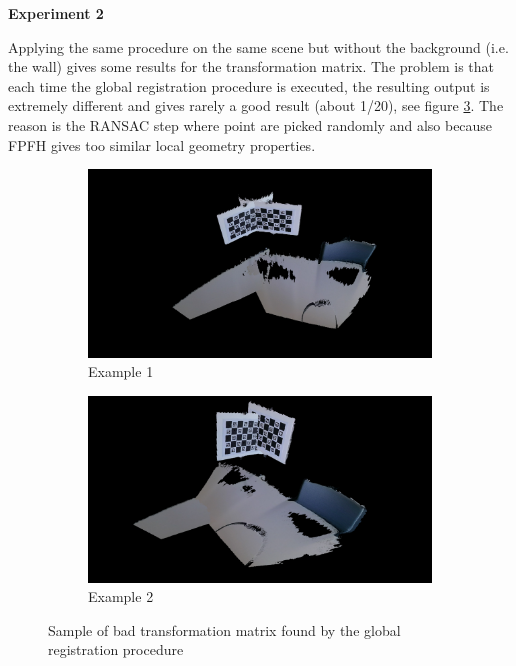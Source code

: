 \textbf{Experiment 2}

Applying the same procedure on the same scene but without the background (i.e. the wall) gives some results for the transformation matrix. The problem is that each time the global registration procedure is executed, the resulting output is extremely different and gives rarely a good result (about 1/20), see figure \ref{figure:ransac}. The reason is the RANSAC step where point are picked randomly and also because FPFH gives too similar local geometry properties.

\begin{figure}[H]
\centering
  \begin{subfigure}[b]{0.48 \textwidth}
    \includegraphics[width=\textwidth]{images/registration/ransac0.png}
    \caption{Example 1}
    \label{figure:ransac0}
  \end{subfigure}
  \hfill
  \begin{subfigure}[b]{0.48 \textwidth}
    \includegraphics[width=\textwidth]{images/registration/ransac1.png}
    \caption{Example 2}
    \label{figure:ransac1}
  \end{subfigure}
  \caption{Sample of bad transformation matrix found by the global registration procedure}
  \label{figure:ransac}
\end{figure}

